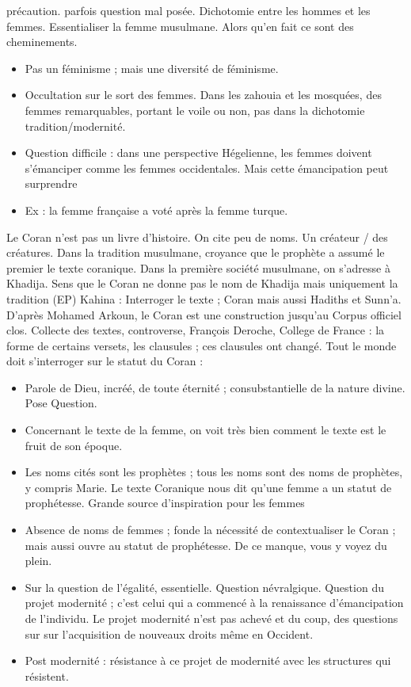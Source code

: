  
précaution. parfois question mal posée. Dichotomie entre les hommes et les femmes. Essentialiser la femme musulmane. Alors qu’en fait ce sont des cheminements.
\begin{itemize}
    \item Pas un féminisme ; mais une diversité de féminisme.
\item 	Occultation sur le sort des femmes. Dans les zahouia et les mosquées, des femmes remarquables, portant le voile ou non, pas dans la dichotomie tradition/modernité.
\item 	Question difficile : dans une perspective Hégelienne, les femmes doivent s’émanciper comme les femmes occidentales. Mais cette émancipation peut surprendre
\item 	Ex : la femme française a voté après la femme turque. 
\end{itemize}

Le Coran n’est pas un livre d’histoire. On cite peu de noms. Un créateur / des créatures.  Dans la tradition musulmane, croyance que le prophète a assumé le premier le texte coranique. Dans la première société musulmane, on s’adresse à Khadija.
Sens que le Coran ne donne pas le nom de Khadija mais uniquement la tradition (EP)
Kahina : 
Interroger le texte ; Coran mais aussi Hadiths et Sunn’a. 
D’après Mohamed Arkoun\label{theol:Arkoun2}, le Coran est une construction jusqu’au Corpus officiel clos. Collecte des textes, controverse, François Deroche, College de France : la forme de certains versets, les clausules ; ces clausules ont changé. Tout le monde doit s’interroger sur le statut du Coran : 
\begin{itemize}
    \item Parole de Dieu, incréé, de toute éternité ; consubstantielle de la nature divine. Pose Question. 
    \item Concernant le texte de la femme, on voit très bien comment le texte est le fruit de son époque. 
    \item	Les noms cités sont les prophètes ; tous les noms sont des noms de prophètes, y compris Marie. Le texte Coranique nous dit qu’une femme a un statut de prophétesse. Grande source d’inspiration pour les femmes
 \item	Absence de noms de femmes ; fonde la nécessité de contextualiser le Coran ; mais aussi ouvre au statut de prophétesse.  De ce manque, vous y voyez du plein. 
 \item	Sur la question de l’égalité, essentielle. Question névralgique. Question du projet modernité ; c’est celui qui a commencé à la renaissance d’émancipation de l’individu. Le projet modernité n’est pas achevé et du coup, des questions sur sur l’acquisition de nouveaux droits même en Occident. 
 \item	Post modernité : résistance à ce projet de modernité avec les structures qui résistent.
\end{itemize}
	

